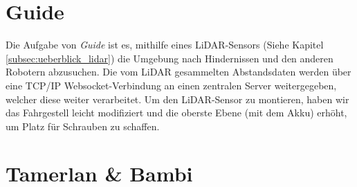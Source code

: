 \section{Guide}
\label{subsec:hardware_guide}
Die Aufgabe von \textit{Guide} ist es,
mithilfe eines LiDAR-Sensors (Siehe Kapitel \ref{subsec:ueberblick_lidar}) die Umgebung nach Hindernissen
und den anderen Robotern abzusuchen.
%
Die vom LiDAR gesammelten Abstandsdaten werden über eine TCP/IP Websocket-Verbindung
an einen zentralen Server weitergegeben,
welcher diese weiter verarbeitet.
%
Um den LiDAR-Sensor zu montieren,
haben wir das Fahrgestell leicht modifiziert
und die oberste Ebene (mit dem Akku) erhöht,
um Platz für Schrauben zu schaffen.

\section{Tamerlan \& Bambi}
\label{subsec:hardware_tamerlan_bambi}